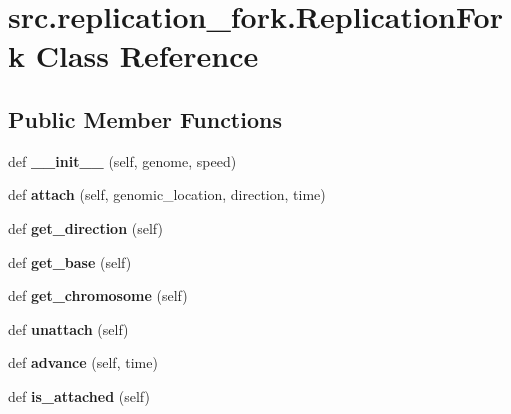 \hypertarget{classsrc_1_1replication__fork_1_1ReplicationFork}{}\section{src.\+replication\+\_\+fork.\+Replication\+Fork Class Reference}
\label{classsrc_1_1replication__fork_1_1ReplicationFork}
\subsection*{Public Member Functions}
\begin{DoxyCompactItemize}
\item 
\mbox{\label{classsrc_1_1replication__fork_1_1ReplicationFork_af367a99eb67ca1a31271404da2ef7d09}} 
def {\bfseries \+\_\+\+\_\+init\+\_\+\+\_\+} (self, genome, speed)
\item 
\mbox{\label{classsrc_1_1replication__fork_1_1ReplicationFork_a90fe573b7f5484d53ad8505e3f4c642e}} 
def {\bfseries attach} (self, genomic\+\_\+location, direction, time)
\item 
\mbox{\label{classsrc_1_1replication__fork_1_1ReplicationFork_a669f976d204fe1e90d8b54b18a644c2a}} 
def {\bfseries get\+\_\+direction} (self)
\item 
\mbox{\label{classsrc_1_1replication__fork_1_1ReplicationFork_ad04ff74265e1ec1239479ea6a16285d3}} 
def {\bfseries get\+\_\+base} (self)
\item 
\mbox{\label{classsrc_1_1replication__fork_1_1ReplicationFork_a328003fa1a3c7651e9a4bf42cd9bb369}} 
def {\bfseries get\+\_\+chromosome} (self)
\item 
\mbox{\label{classsrc_1_1replication__fork_1_1ReplicationFork_a896dbe094f49d83214d10577e57df880}} 
def {\bfseries unattach} (self)
\item 
\mbox{\label{classsrc_1_1replication__fork_1_1ReplicationFork_a2ac7936de4706e9b0d19dbeb27b51be8}} 
def {\bfseries advance} (self, time)
\item 
\mbox{\label{classsrc_1_1replication__fork_1_1ReplicationFork_af1fe50a6b3eeb6c3b0799051a207c081}} 
def {\bfseries is\+\_\+attached} (self)
\end{DoxyCompactItemize}
